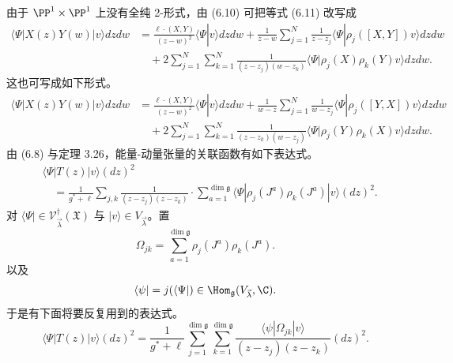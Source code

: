 由于 $\PP^1\times\PP^1$ 上没有全纯 2-形式，由 (6.10) 可把等式 (6.11) 改写成
\begin{align}
\langle\Psi|X(z)Y(w)|v\rangle dzdw&=\frac{\ell\cdot(X,Y)}{(z-w)^2}\langle\Psi|v\rangle dzdw+\frac{1}{z-w}\sum_{j=1}^{N}\frac{1}{z-z_j}\langle\Psi|\rho_j([X,Y])v\rangle dzdw\nonumber\\
&\quad+2\sum_{j=1}^{N}\sum_{k=1}^{N}\frac{1}{(z-z_j)(w-z_k)}\langle\Psi|\rho_j(X)\rho_k(Y)v\rangle dzdw.\tag{6.12}
\end{align}
这也可写成如下形式。
\begin{align}
\langle\Psi|X(z)Y(w)|v\rangle dzdw&=\frac{\ell\cdot(X,Y)}{(z-w)^2}\langle\Psi|v\rangle dzdw+\frac{1}{w-z}\sum_{j=1}^{N}\frac{1}{w-z_j}\langle\Psi|\rho_j([Y,X])v\rangle dzdw\nonumber\\
&\quad+2\sum_{j=1}^{N}\sum_{k=1}^{N}\frac{1}{(z-z_k)(w-z_j)}\langle\Psi|\rho_j(Y)\rho_k(X)v\rangle dzdw.\tag{6.13}
\end{align}
由 (6.8) 与定理 3.26，能量-动量张量的关联函数有如下表达式。
\begin{align}
&\langle\Psi|T(z)|v\rangle(dz)^2\nonumber\\
&\quad=\frac{1}{g^*+\ell}\sum_{j,k}\frac{1}{(z-z_j)(z-z_k)}\cdot\sum_{a=1}^{\dim\mathfrak{g}}\langle\Psi|\rho_j(J^a)\rho_k(J^a)|v\rangle(dz)^2.\tag{6.14}
\end{align}
对 $\langle\Psi|\in\mathcal{V}^{\dagger}_{\vec\lambda}(\mathfrak{X})$ 与 $|v\rangle\in V_{\vec\lambda}$。置
\begin{equation}
\Omega_{jk}=\sum_{a=1}^{\dim\mathfrak{g}}\rho_j(J^a)\rho_k(J^a).\tag{6.15}
\end{equation}
以及
\[
\langle\psi|=j(\langle\Psi|)\in\Hom_{\mathfrak{g}}(V_{\vec\lambda},\C).
\]
于是有下面将要反复用到的表达式。
\begin{equation}
\langle\Psi|T(z)|v\rangle(dz)^2=\frac{1}{g^*+\ell}\sum_{j=1}^{\dim\mathfrak{g}}\sum_{k=1}^{\dim\mathfrak{g}}\frac{\langle\psi|\Omega_{jk}|v\rangle}{(z-z_j)(z-z_k)}(dz)^2.\tag{6.16}
\end{equation}
